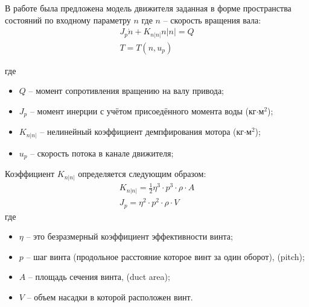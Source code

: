 В работе \cite{10.1109/48.107145} была предложена модель движителя заданная в форме пространства состояний по входному параметру $n$ где $n$ -- скорость вращения вала:
\begin{equation}
    \label{eq:thruster_dynamic_1}
    \begin{array}{c}
        J_p\dot{n} + K_{n|n|}n|n| = Q \\
        T = T(n, u_p)
    \end{array}
\end{equation}

\noindent где
\begin{itemize}
    \item $Q$ -- момент сопротивления вращению на валу привода;
    \item $J_p$ -- момент инерции с учётом присоедённого момента воды (кг$\cdot$м$^2$);
    \item $K_{n|n|}$ -- нелинейный коэффициент демпфирования мотора (кг$\cdot$м$^2$);
    \item $u_p$ -- скорость потока в канале движителя;
\end{itemize}




Коэффициент $K_{n|n|}$ определяется следующим образом:
\begin{gather*}
    K_{n|n|} = \frac{1}{2}\eta^3 \cdot p^3 \cdot \rho \cdot A \\
    J_p = \eta^2 \cdot p^2 \cdot \rho \cdot V
\end{gather*}
\noindent где
\begin{itemize}
    \item $\eta$ -- это безразмерный коэффициент эффективности винта;
    \item $p$ -- шаг винта (продольное расстояние которое винт за один оборот), (pitch);
    \item $A$ -- площадь сечения винта, (duct area);
    \item $V$ -- объем насадки в которой расположен винт.
\end{itemize}

